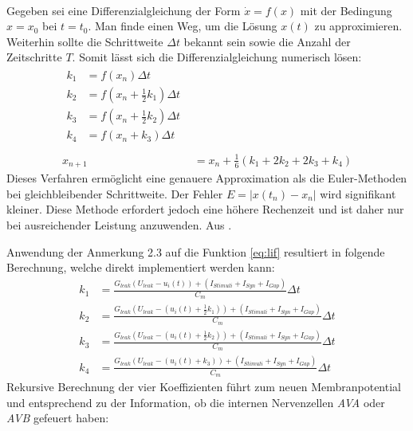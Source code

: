 	\begin{remark}\\
		Gegeben sei eine Differenzialgleichung der Form $\dot{x} = f(x)$ mit der Bedingung $x = x_0$ bei $t = t_0$. Man finde einen Weg, um die Lösung $x(t)$ zu approximieren.\\
		Weiterhin sollte die Schrittweite $\Delta t$ bekannt sein sowie die Anzahl der Zeitschritte $T$. Somit lässt sich die Differenzialgleichung numerisch lösen:
		\begin{align}
			\begin{split}
			\label{eq:runkgekutta}
			k_1 &= f(x_n) \Delta t\\
			k_2 &= f(x_n + \tfrac{1}{2} k_1) \Delta t\\
			k_3 &= f(x_n + \tfrac{1}{2} k_2) \Delta t\\
			k_4 &= f(x_n + k_3) \Delta t\\
			\end{split}\\[10pt]
			x_{n+1} &= x_n + \tfrac{1}{6} (k_1 + 2 k_2 + 2 k_3 + k_4)
		\end{align}
		Dieses Verfahren ermöglicht eine genauere Approximation als die Euler-Methoden bei gleichbleibender Schrittweite. Der Fehler $E = |x(t_n)-x_n|$ wird signifikant kleiner. Diese Methode erfordert jedoch eine höhere Rechenzeit und ist daher nur bei ausreichender Leistung anzuwenden. Aus \cite{NonlinearDynamics}.
	\end{remark}
	Anwendung der Anmerkung 2.3 auf die Funktion \eqref{eq:lif} resultiert in folgende Berechnung, welche direkt implementiert werden kann:
	\begin{equation}
	\begin{split}
		\label{eq:runkgekutta_nn}
		k_1 &= \frac{G_{leak} (U_{leak} - u_i(t)) + (I_{Stimuli} + I_{Syn} + I_{Gap})}{C_m} \Delta t\\
		k_2 &= \frac{G_{leak} (U_{leak} - (u_i(t) + \tfrac{1}{2} k_1)) + (I_{Stimuli} + I_{Syn} + I_{Gap})}{C_m} \Delta t\\
		k_3 &= \frac{G_{leak} (U_{leak} - (u_i(t) + \tfrac{1}{2} k_2)) + (I_{Stimuli} + I_{Syn} + I_{Gap})}{C_m} \Delta t\\
		k_4 &= \frac{G_{leak} (U_{leak} - (u_i(t) + k_3)) + (I_{Stimuli} + I_{Syn} + I_{Gap})}{C_m} \Delta t
	\end{split}
	\end{equation}
	Rekursive Berechnung der vier Koeffizienten führt zum neuen Membranpotential und entsprechend zu der Information, ob die internen Nervenzellen \textit{AVA} oder \textit{AVB} gefeuert haben:
